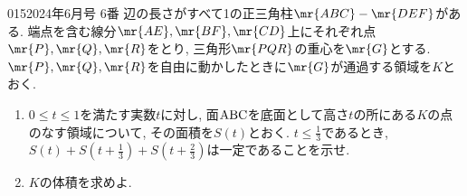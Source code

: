 \begin{prob}{015}{}{2024年6月号 6番}
 辺の長さがすべて1の正三角柱$\mr{ABC}-\mr{DEF}$がある. 端点を含む線分$\mr{AE}, \mr{BF}, \mr{CD}$上にそれぞれ点$\mr{P}, \mr{Q}, \mr{R}$をとり, 三角形$\mr{PQR}$の重心を$\mr{G}$とする. $\mr{P}, \mr{Q}, \mr{R}$を自由に動かしたときに$\mr{G}$が通過する領域を$K$とおく.
\begin{enumerate}
\item $0\leq t\leq 1$を満たす実数$t$に対し, 面${\rm ABC}$を底面として高さ$t$の所にある$K$の点のなす領域について, その面積を$S(t)$とおく. $t\leq\frac{1}{3}$であるとき, $S(t) + S(t+\frac{1}{3}) + S(t+\frac{2}{3})$は一定であることを示せ. %
\item $K$の体積を求めよ.
\end{enumerate}
\end{prob}
